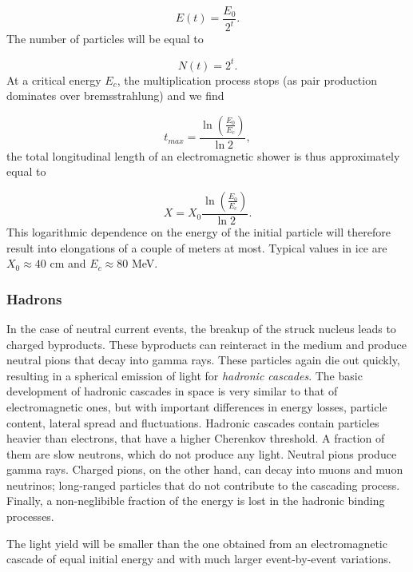 \begin{equation}
E(t) = \frac{E_0}{2^t}.
\end{equation}
The number of particles will be equal to

\begin{equation}
N(t) = 2^t.
\end{equation}
At a critical energy $E_c$, the multiplication process stops (as pair production dominates over bremsstrahlung) and we find

\begin{equation}
t_{max} = \frac{\ln\left(\frac{E_0}{E_c}\right)}{\ln 2},
\end{equation}
the total longitudinal length of an electromagnetic shower is thus approximately equal to

\begin{equation}
X = X_0 \frac{\ln\left(\frac{E_0}{E_c}\right)}{\ln 2}.
\end{equation}
This logarithmic dependence on the energy of the initial particle will therefore result into elongations of a couple of meters at most. Typical values in ice are $X_0 \approx 40$ cm and $E_c \approx 80$ MeV.

\subsubsection{Hadrons}
In the case of neutral current events, the breakup of the struck nucleus leads to charged byproducts. These byproducts can reinteract in the medium and produce neutral pions that decay into gamma rays. These particles again die out quickly, resulting in a spherical emission of light for \textit{hadronic cascades}. The basic development of hadronic cascades in space is very similar to that of electromagnetic ones, but with important differences in energy losses, particle content, lateral spread and fluctuations. Hadronic cascades contain particles heavier than electrons, that have a higher Cherenkov threshold. A fraction of them are slow neutrons, which do not produce any light. Neutral pions produce gamma rays. Charged pions, on the other hand, can decay into muons and muon neutrinos; long-ranged particles that do not contribute to the cascading process. Finally, a non-neglibible fraction of the energy is lost in the hadronic binding processes.

The light yield will be smaller than the one obtained from an electromagnetic cascade of equal initial energy and with much larger event-by-event variations. 


